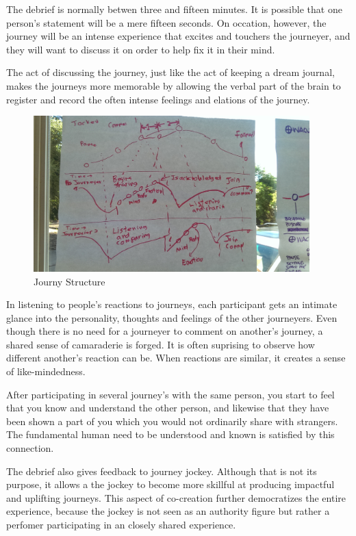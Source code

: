 \documentclass[12pt]{book}
\begin{document}
The debrief is normally betwen three and fifteen minutes. It
is possible that one person's statement will be a mere fifteen
seconds. On occation, however, the journey will be an intense
experience that excites and touchers the journeyer, and they
will want to discuss it on order to help fix it in their mind.

The act of discussing the journey, just like the act of keeping
a dream journal, makes the journeys more memorable by allowing
the verbal part of the brain to register and record the often
intense feelings and elations of the journey.

\begin{figure}
  \centering
     \includegraphics[width=0.95\textwidth]{WacuriFigures/JourneyerInteraction.jpg}
     \caption{Journy Structure}
  \label{fig:closeup}     
\end{figure}


In listening to people's reactions to journeys, each participant
gets an intimate glance into the personality, thoughts and feelings
of the other journeyers. Even though there is no need for a journeyer
to comment on another's journey, a shared sense of camaraderie is forged.
It is often suprising to observe how different another's reaction
can be. When reactions are similar, it creates a sense of like-mindedness.

After participating in several journey's with the same person, you
start to feel that you know and understand the other person, and
likewise that they have been shown a part of you which you would
not ordinarily share with strangers. The fundamental human need
to be understood and known is satisfied by this connection.

The debrief also gives feedback to journey jockey. Although that is
not its purpose, it allows a the jockey to become more skillful
at producing impactful and uplifting journeys. This aspect of
co-creation further democratizes the entire experience, because
the jockey is not seen as an authority figure but rather a
perfomer participating in an closely shared experience.
\end{document}
